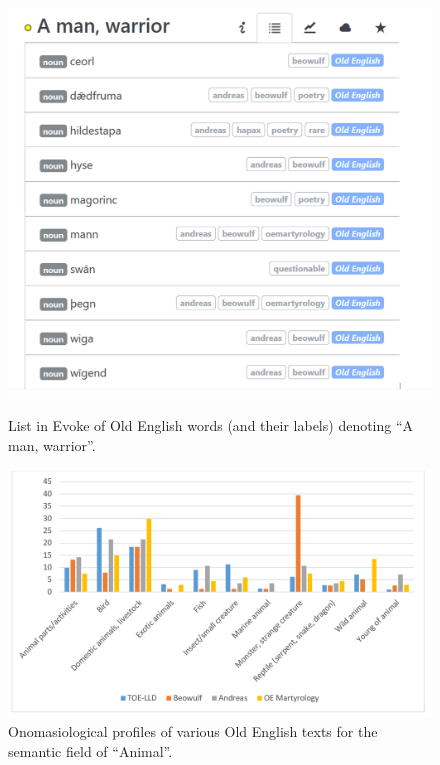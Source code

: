 \begin{figure}[htbp]
\centering
\begin{minipage}{.48\textwidth}
  \includegraphics[width=\textwidth]{Stolk2021x/fig/Porck-warrior.png}
	\caption[]{\label{fig:Stolk2021x:Porck-fig1}List in Evoke of Old English words (and their labels) denoting ``A man, warrior''.}
\end{minipage}
\begin{minipage}{.04\textwidth}\end{minipage}
\begin{minipage}{.48\textwidth}
  \raggedleft
  \includegraphics[width=\textwidth]{Stolk2021x/fig/Porck-animals.png}
	\caption[]{\label{fig:Stolk2021x:Porck-fig2}Onomasiological profiles of various Old English texts for the semantic field of ``Animal''.}
\end{minipage}
\end{figure}

